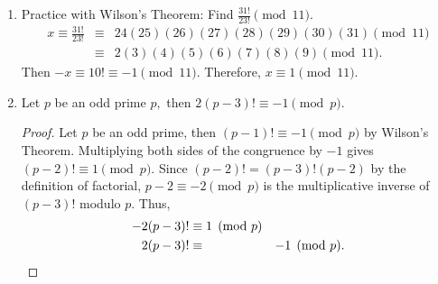 \documentclass[letterpaper, 11 pt]{ximera}
\begin{document}
\begin{example}
\begin{enumerate}
 \item  Practice with Wilson's Theorem: 
 Find  $\frac{31!}{23!} \pmod{11}.$
 \begin{align*}
 x\equiv \frac{31!}{23!}	 & \equiv & 24(25)(26)(27)(28)(29)(30)(31) \pmod{11}\\
 			 & \equiv & 2(3)(4)(5)(6)(7)(8)(9) \pmod{11}.
\end{align*}
Then $-x\equiv 10! \equiv -1\pmod{11}.$ Therefore, $x\equiv 1\pmod{11}.$

\item Let $p$ be an odd prime $p,$ then $2(p-3)!\equiv -1 \pmod{p}$.
 
\begin{proof}
 Let $p$ be an odd prime, then $(p-1)!\equiv -1\pmod{p}$ by Wilson's Theorem. Multiplying both sides of the congruence by $-1$ gives $(p-2)!\equiv 1\pmod{p}.$ Since $(p-2)!=(p-3)!(p-2)$ by the definition of factorial, $p-2\equiv -2\pmod{p}$ is the multiplicative inverse of $(p-3)!$ modulo $p.$ Thus, 
\begin{align*}
 -2(p-3)!	&\equiv 1\pmod{p}\\
 2(p-3)!	 & \equiv & -1\pmod{p}.\qedhere
\end{align*}
\end{proof}
\end{enumerate}

\end{example}


\end{document}
